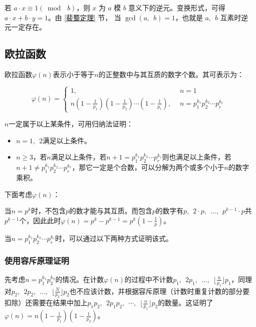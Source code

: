 \documentclass[a4paper]{article}         %
\begin{document}
若 $a \cdot x \equiv 1 (\bmod \phantom{;} b)$，则 $x$ 为 $a$ 模 $b$ 意义下的逆元。变换形式，可得$a \cdot x + b \cdot y = 1$。由 \ref{裴蜀定理} 节， 当 $\gcd(a, \phantom{;} b) = 1$，也就是 $a, \phantom{;} b$ 互素时逆元一定存在。

\subsection{欧拉函数}

欧拉函数$\varphi(n)$表示小于等于$n$的正整数中与其互质的数字个数。其可表示为：

\[
	\varphi(n)=\begin{cases}
		1, \phantom{;} &n = 1\\
		n(1- \frac{1}{p_1})(1-\frac{1}{p_2}) \cdots (1-\frac{1}{p_r}), \phantom{;} &n = p_{1}^{k_1} p_{2}^{k_2} \cdots p_{r}^{k_r}
	\end{cases}
\]

$n$一定属于以上某条件，可用归纳法证明：

\begin{itemize}
	\item $n=1, \phantom{;} 2$满足以上条件。
	\item $n \geq 3$，若$n$满足以上条件，若$n+1 = p_{1}^{k_1}p_{2}^{k_2}\cdots p_{r}^{k_r}$则也满足以上条件，若$n+1 \neq p_{1}^{k_1}p_{2}^{k_2}\cdots p_{r}^{k_r}$，那它一定是个合数，可以分解为两个或多个小于$n$的数字乘积。
\end{itemize}

下面考虑$\varphi(n)$：

当$n = p^k$时，不包含$p$的数才能与其互质。而包含$p$的数字有$p, \phantom{;}2\cdot p, \phantom{;}\ldots , \phantom{;}p^{k-1}\cdot p$共$p^{k-1}$个，因此此时$\varphi(n) = p^k - p^{k-1} = p^k (1 - \frac{1}{p} )$。

当$n = p_{1}^{k_1}p_{2}^{k_2}\cdots p_{r}^{k_r}$时，可以通过以下两种方式证明该式。

\subsubsection{使用容斥原理证明}

\begin{sloppypar}
先考虑$n = p_{1}^{k_1}p_{2}^{k_2}$的情况。在计数$\varphi(n)$的过程中不计数$p_1, \phantom{;} 2p_1, \phantom{;} \ldots, \phantom{;} \lfloor \frac{n}{p_1} \rfloor p_1$，同理对$p_2, \phantom{;} 2p_2, \phantom{;} \ldots, \phantom{;} \lfloor \frac{N}{p_2} \rfloor p_2$也不应该计数，并根据容斥原理（计数时重复计数的部分要扣除）还需要在结果中加上$p_1p_2, \phantom{;} 2p_1p_2, \phantom{;} \cdots, \phantom{;} \lfloor \frac{n}{p_1} \rfloor p_2$的数量。这证明了$\varphi(n)=n(1-\frac{1}{p_1})(1-\frac{1}{p_2})$。
\end{sloppypar}
\end{document}
